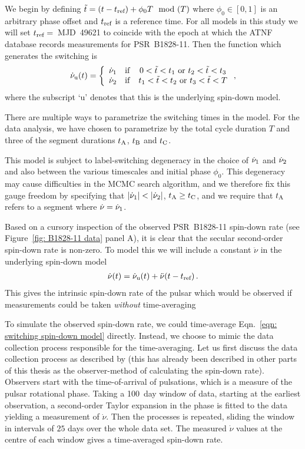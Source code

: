 \documentclass[../full_thesis/full_thesis.tex]{subfiles}
\begin{document}
We begin by defining $\tilde{t} = (t-t_{\textrm{ref}}) + \phi_{0}T\mod(T)$ where $\phi_0 \in [0,
1]$ is an arbitrary phase offset and $t_{\textrm{ref}}$ is a reference time. For all models
in this study we will set $t_{\textrm{ref}}=$~MJD~49621 to coincide with the epoch at which
the ATNF database \citet{Manchester1977} records measurements for PSR~B1828-11.
Then the function which generates the switching is
\begin{align}
\dot{\nu}_{\mathrm{u}}(t) = \left\{
    \begin{array}{ccc}
    \dot{\nu}_{1} & \mathrm{if} & 0 < \tilde{t} < t_{1}
    \textrm{ or } t_{2} < \tilde{t} < t_{3} \\
    \dot{\nu}_{2} & \mathrm{if} & t_{1} < \tilde{t} < t_{2}
    \textrm{ or } t_{3} < \tilde{t} < T\\
    \end{array}
    \right. ,
\end{align}
where the subscript `u' denotes that this is the underlying spin-down model.

There are multiple ways to parametrize the switching times in the model. For
the data analysis, we have chosen to parametrize by the total cycle duration
$T$ and three of the segment durations $t_{\mathrm{A}}$, $t_{\mathrm{B}}$ and $t_{\mathrm{C}}$.

This model is subject to label-switching degeneracy in the choice of
$\dot{\nu}_{1}$ and $\dot{\nu}_{2}$ and also between the various timescales and
initial phase $\phi_0$.  This degeneracy may cause difficulties in the MCMC
search algorithm, and we therefore fix this gauge freedom by specifying that
$|\dot{\nu}_{1}| < |\dot{\nu}_{2}|$, $t_{\mathrm{A}} \ge t_{\mathrm{C}}$, and we require that $t_{\mathrm{A}}$
refers to a segment where $\dot{\nu} = \dot{\nu}_{1}$.

Based on a cursory inspection of the observed PSR~B1828-11 spin-down rate (see
Figure~\ref{fig: B1828-11 data} panel A), it is clear that the secular
second-order spin-down rate is non-zero. To model this we will include a
constant $\ddot{\nu}$ in the underlying spin-down model
\begin{align}
    \dot{\nu}(t) = \dot{\nu}_{\mathrm{u}}(t) + \ddot{\nu}(t-t_{\textrm{ref}})\,.
\label{eqn: switching spin-down model}
\end{align}
This gives the intrinsic spin-down rate of the pulsar which would be observed if
measurements could be taken \emph{without} time-averaging

To simulate the observed spin-down rate, we could time-average Eqn.~\eqref{eqn:
switching spin-down model} directly. Instead, we choose to mimic the data
collection process responsible for the time-averaging. Let
us first discuss the data collection process as described by \citet{Lyne2010} (this
has already been described in other parts of this thesis as the observer-method of
calculating the spin-down rate).
Observers start with the time-of-arrival of pulsations, which is a measure of
the pulsar rotational phase. Taking a 100~day window of data, starting at the
earliest observation, a second-order Taylor expansion in the phase is fitted to
the data yielding a measurement of $\dot{\nu}$. Then the processes is repeated,
sliding the window in intervals of $25$ days over the whole data set. The
measured $\dot{\nu}$ values at the centre of each window gives a time-averaged
spin-down rate.
\end{document}
